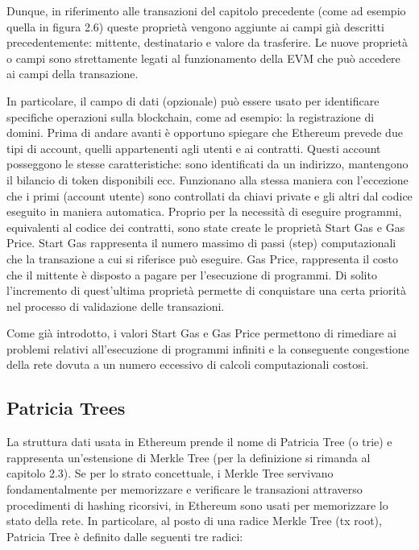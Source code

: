 Dunque, in riferimento alle transazioni del capitolo precedente (come ad esempio quella in figura 2.6) queste proprietà vengono aggiunte ai campi già descritti precedentemente: mittente, destinatario e valore da trasferire. Le nuove proprietà o campi sono strettamente legati al funzionamento della EVM che può accedere ai campi della transazione.

In particolare, il campo di dati (opzionale) può essere usato per identificare specifiche operazioni sulla blockchain, come ad esempio: la registrazione di domini. Prima di andare avanti è opportuno spiegare che Ethereum prevede due tipi di account, quelli appartenenti agli utenti e ai contratti. Questi account posseggono le stesse caratteristiche: sono identificati da un indirizzo, mantengono il bilancio di token disponibili ecc. Funzionano alla stessa maniera con l’eccezione che i primi (account utente) sono controllati da chiavi private e gli altri dal codice eseguito in maniera automatica. Proprio per la necessità di eseguire programmi, equivalenti al codice dei contratti, sono state create le proprietà Start Gas e Gas Price. Start Gas rappresenta il numero massimo di passi (step) computazionali che la transazione a cui si riferisce può eseguire. Gas Price, rappresenta il costo che il mittente è disposto a pagare per l’esecuzione di programmi. Di solito l’incremento di quest’ultima proprietà permette di conquistare una certa priorità nel processo di validazione delle transazioni.

Come già introdotto, i valori Start Gas e Gas Price permettono di rimediare ai problemi relativi all'esecuzione di programmi infiniti e la conseguente congestione della rete dovuta a un numero eccessivo di calcoli computazionali costosi.

\subsection{Patricia Trees}

La struttura dati usata in Ethereum prende il nome di Patricia Tree (o trie) e rappresenta un’estensione di Merkle Tree (per la definizione si rimanda al capitolo 2.3). Se per lo strato concettuale, i Merkle Tree servivano fondamentalmente per memorizzare e verificare le transazioni attraverso procedimenti di hashing ricorsivi, in Ethereum sono usati per memorizzare lo stato della rete. In particolare, al posto di una radice Merkle Tree (tx root), Patricia Tree è definito dalle seguenti tre radici:

